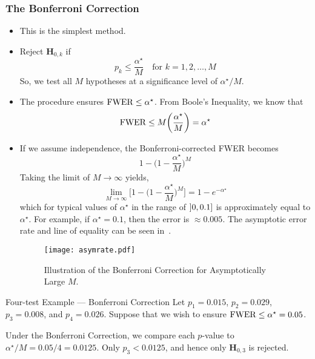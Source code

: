 \subsubsection*{The Bonferroni Correction}
\begin{itemize}
      \item This is the simplest method.
      \item Reject $ \mathbf{H}_{0,k} $ if
            \[ p_k\le \frac{\alpha^\star}{M} \quad\text{for }k=1,2,\ldots,M \]
            So, we test all $ M $ hypotheses at a significance level of $ \alpha^\star/M $.
      \item The procedure ensures $ \operatorname{FWER}\le \alpha^\star $. From Boole's Inequality,
            we know that
            \[ \operatorname{FWER}\le M\biggl(\frac{\alpha^\star}{M}\biggr)=\alpha^\star \]
      \item If we assume independence, the Bonferroni-corrected FWER becomes
            \[ 1-\biggl(1-\frac{\alpha^\star}{M} \biggr)^{\! M} \]
            Taking the limit of $ M \to\infty $ yields,
            \[ \lim\limits_{{M} \to {\infty}}\Biggl[1-\biggl(1-\frac{\alpha^\star}{M} \biggr)^{\! M}\Biggr]=1-e^{-\alpha^\star}  \]
            which for typical values of $ \alpha^\star $ in the range of $ \interval[open left]{0}{0.1} $ is approximately equal to $ \alpha^\star $.
            For example, if $ \alpha^\star=0.1 $, then the error is $ \approx 0.005 $. The asymptotic error rate
            and line of equality can be seen in~.
            \begin{figure}[!htbp]
                  \centering
                  \texttt{[image: asymrate.pdf]}
                  \caption{Illustration of the Bonferroni Correction for Asymptotically Large $M$.}\label{fig:asymrate}
            \end{figure}
\end{itemize}
\begin{Example}{Four-test Example --- Bonferroni Correction}{}
      Let $ p_1=0.015 $, $ p_2=0.029 $, $ p_3=0.008 $, and $ p_4=0.026 $. Suppose that we wish to ensure
      $ \operatorname{FWER}\le \alpha^\star=0.05 $.

      \vspace{2mm}

      Under the Bonferroni Correction, we compare each
      $ p $-value to $ \alpha^\star/M=0.05/4=0.0125 $. Only $ p_3<0.0125 $, and hence
      only $ \mathbf{H}_{0,3} $ is rejected.
\end{Example}
